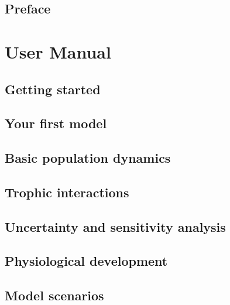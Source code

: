 \documentclass [a4paper, 11pt, openany]  {memoir}
\begin{document}
\midsloppy
\pagestyle{ruled}
\frontmatter


\chapter{Preface}
\mainmatter

\part{User Manual}

\chapter{Getting started}

\chapter{Your first model}

\chapter{Basic population dynamics}

\chapter{Trophic interactions}

\chapter{Uncertainty and sensitivity analysis}

\chapter{Physiological development}

\chapter{Model scenarios}

\end{document}
